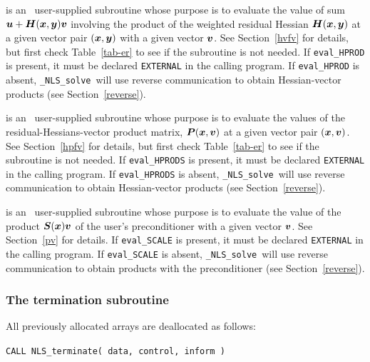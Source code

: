 \documentclass{galahad}
\newcommand{\packagename}{NLS}
\newcommand{\fullpackagename}{\libraryname\_\packagename}
\newcommand{\solver}{{\tt \fullpackagename\_solve}}
\begin{document}
\begin{description}
 is an \optional\
user-supplied subroutine whose purpose is to evaluate the value of sum
${\bm{u}} + {\bm{H}}({\bm{x}},{\bm{y}}) {\bm{v}}$ involving the product of the weighted residual
Hessian ${\bm{H}}({\bm{x}},{\bm{y}})$ at a given vector pair $({\bm{x}},{\bm{y}})$
with a given vector ${\bm{v}}$. See Section~\ref{hvfv} for details,
but first check Table~\ref{tab-er} to see if the subroutine is not needed.
If {\tt eval\_HPROD} is present,
it must be declared {\tt EXTERNAL} in the calling program.
If {\tt eval\_HPROD} is absent, \solver\ will use reverse communication to
obtain Hessian-vector products (see Section~\ref{reverse}).

 is an \optional\
user-supplied subroutine whose purpose is to evaluate the values of the
residual-Hessians-vector product matrix, ${\bm{P}}({\bm{x}},{\bm{v}})$
at a given vector pair $({\bm{x}},{\bm{v}})$.
See Section~\ref{hpfv} for details,
but first check Table~\ref{tab-er} to see if the subroutine is not needed.
If {\tt eval\_HPRODS} is present,
it must be declared {\tt EXTERNAL} in the calling program.
If {\tt eval\_HPRODS} is absent, \solver\ will use reverse communication to
obtain Hessian-vector products (see Section~\ref{reverse}).

 is an \optional\
user-supplied subroutine whose purpose is to evaluate the value of the
product ${\bm{S}}({\bm{x}}){\bm{v}}$ of the user's preconditioner with a given vector
${\bm{v}}$. See Section~\ref{pv} for details.
If {\tt eval\_SCALE} is present,
it must be declared {\tt EXTERNAL} in the calling program.
If {\tt eval\_SCALE} is absent, \solver\ will use reverse communication to
obtain products with the preconditioner (see Section~\ref{reverse}).

\end{description}


\subsubsection{The  termination subroutine}
All previously allocated arrays are deallocated as follows:
\vspace*{1mm}

\hspace{8mm}
{\tt CALL \packagename\_terminate( data, control, inform )}
\end{document}
